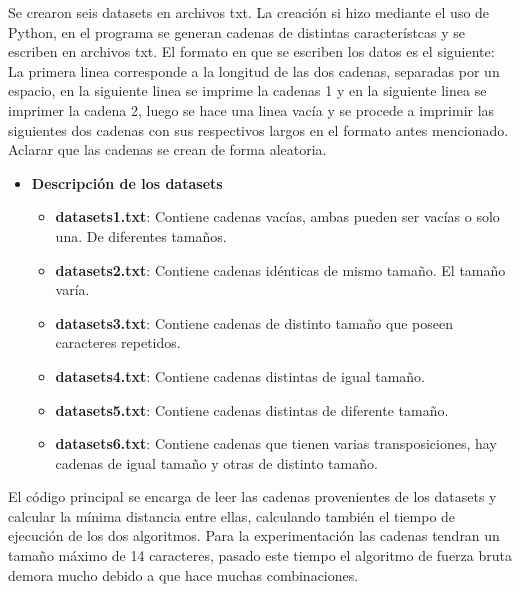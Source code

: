 Se crearon seis datasets en archivos txt. La creación si hizo mediante el uso de Python, en el programa se generan cadenas de distintas característcas y se escriben en archivos txt. El formato en que se escriben los datos es el siguiente:
La primera linea corresponde a la longitud de las dos cadenas, separadas por un espacio, en la siguiente linea se imprime la cadenas 1 y en la siguiente linea se imprimer la cadena 2, luego se hace una linea vacía y se procede a imprimir las siguientes dos cadenas con sus respectivos largos en el formato antes mencionado.
Aclarar que las cadenas se crean de forma aleatoria.\\
\begin{itemize}
    \item \textbf{Descripción de los datasets}
    \begin{itemize}
        \item \textbf{datasets1.txt}: Contiene cadenas vacías, ambas pueden ser vacías o solo una. De diferentes tamaños.
        \item \textbf{datasets2.txt}: Contiene cadenas idénticas de mismo tamaño. El tamaño varía.  
        \item \textbf{datasets3.txt}: Contiene cadenas de distinto tamaño que poseen caracteres repetidos.
        \item \textbf{datasets4.txt}: Contiene cadenas distintas de igual tamaño.
        \item \textbf{datasets5.txt}: Contiene cadenas distintas de diferente tamaño.
        \item \textbf{datasets6.txt}: Contiene cadenas que tienen varias transposiciones, hay cadenas de igual tamaño y otras de distinto tamaño.
    \end{itemize}
\end{itemize} 

El código principal se encarga de leer las cadenas provenientes de los datasets y calcular la mínima distancia entre ellas, calculando también el tiempo de ejecución de los dos algoritmos.
Para la experimentación las cadenas tendran un tamaño máximo de 14 caracteres, pasado este tiempo el algoritmo de fuerza bruta demora mucho debido a que hace muchas combinaciones.